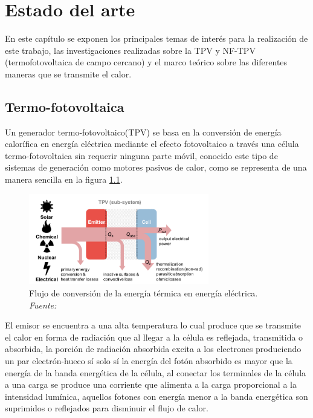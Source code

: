 \chapter{Estado del arte}
En este capítulo se exponen los principales temas de interés para la realización de este trabajo, las investigaciones realizadas sobre la TPV y NF-TPV (termofotovoltaica de campo cercano) y el marco teórico sobre las diferentes maneras que se transmite el calor.

\section{Termo-fotovoltaica}
Un generador termo-fotovoltaico(TPV) se basa en la conversión de energía calorífica en energía eléctrica mediante el efecto fotovoltaico a través una célula termo-fotovoltaica sin requerir ninguna parte móvil, conocido este tipo de sistemas de generación como motores pasivos de calor, como se representa de una manera sencilla en la figura \ref{fig:TPV_Subsistema}.
\begin{figure}[H]
	\centering
	\includegraphics[width=0.7\textwidth]{figuras/TPV_Subsistema.png}
	\caption[Flujo de conversión de la energía térmica en energía eléctrica]{Flujo de conversión de la energía térmica en energía eléctrica. \textit{Fuente: \cite{Present_Efficiencies_and_Future_Opportunities_in_Thermophotovoltaics}}}
	\label{fig:TPV_Subsistema}
\end{figure}
El emisor se encuentra a una alta temperatura lo cual produce que se transmite el calor en forma de radiación que al llegar a la célula es reflejada, transmitida o absorbida, la porción de radiación absorbida excita a los electrones produciendo un par electrón-hueco sí solo sí la energía del fotón absorbido es mayor que la energía de la banda energética de la célula, al conectar los terminales de la célula a una carga se produce una corriente que alimenta a la carga proporcional a la intensidad lumínica, aquellos fotones con energía menor a la banda energética son suprimidos o reflejados para disminuir el flujo de calor\cite{Present_Efficiencies_and_Future_Opportunities_in_Thermophotovoltaics}.\\\\
